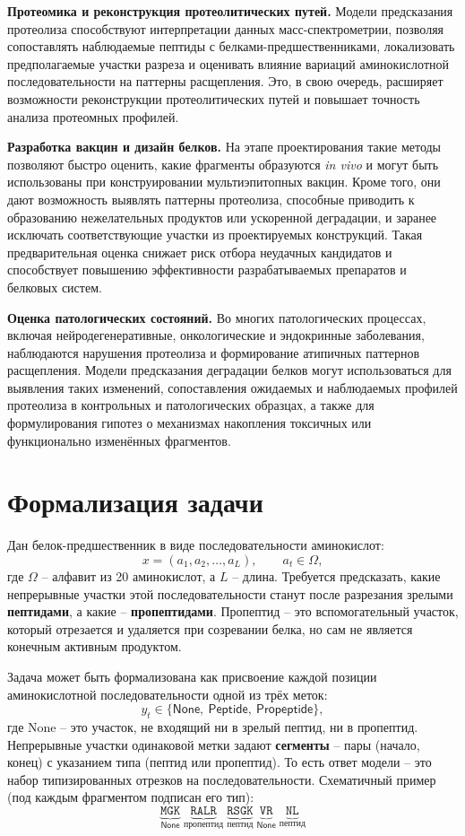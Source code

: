 \documentclass{article}
\begin{document}
\textbf{Протеомика и реконструкция протеолитических путей.} Модели предсказания протеолиза способствуют интерпретации данных масс-спектрометрии, позволяя сопоставлять наблюдаемые пептиды с белками-предшественниками, локализовать предполагаемые участки разреза и оценивать влияние вариаций аминокислотной последовательности на паттерны расщепления. Это, в свою очередь, расширяет возможности реконструкции протеолитических путей и повышает точность анализа протеомных профилей.

\textbf{Разработка вакцин и дизайн белков.} На этапе проектирования такие методы позволяют быстро оценить, какие фрагменты образуются \textit{in vivo} и могут быть использованы при конструировании мультиэпитопных вакцин. Кроме того, они дают возможность выявлять паттерны протеолиза, способные приводить к образованию нежелательных продуктов или ускоренной деградации, и заранее исключать соответствующие участки из проектируемых конструкций. Такая предварительная оценка снижает риск отбора неудачных кандидатов и способствует повышению эффективности разрабатываемых препаратов и белковых систем.

\textbf{Оценка патологических состояний.} Во многих патологических процессах, включая нейродегенеративные, онкологические и эндокринные заболевания, наблюдаются нарушения протеолиза и формирование атипичных паттернов расщепления. Модели предсказания деградации белков могут использоваться для выявления таких изменений, сопоставления ожидаемых и наблюдаемых профилей протеолиза в контрольных и патологических образцах, а также для формулирования гипотез о механизмах накопления токсичных или функционально изменённых фрагментов.

\section{Формализация задачи}
Дан белок-предшественник в виде последовательности аминокислот:
$$ x = (a_1, a_2, \dots, a_L), \qquad a_t \in \Omega, $$
где $\Omega$ -- алфавит из 20 аминокислот, а $L$ -- длина. Требуется предсказать, какие непрерывные участки этой последовательности станут после разрезания зрелыми \textbf{пептидами}, а какие -- \textbf{пропептидами}. Пропептид -- это вспомогательный участок, который отрезается и удаляется при созревании белка, но сам не является конечным активным продуктом.

Задача может быть формализована как присвоение каждой позиции аминокислотной последовательности одной из трёх меток:
$$ y_t \in \{\textsf{None},\ \textsf{Peptide},\ \textsf{Propeptide}\}, $$
где \textsf{None} -- это участок, не входящий ни в зрелый пептид, ни в пропептид. Непрерывные участки одинаковой метки задают \textbf{сегменты} -- пары (начало, конец) с указанием типа (пептид или пропептид). То есть ответ модели -- это набор типизированных отрезков на последовательности. Схематичный пример (под каждым фрагментом подписан его тип):
$$
\underbrace{\texttt{MGK}}_{\textsf{None}}\;
\underbrace{\texttt{RALR}}_{\textsf{пропептид}}\;
\underbrace{\texttt{RSGK}}_{\textsf{пептид}}\;
\underbrace{\texttt{VR}}_{\textsf{None}}\;
\underbrace{\texttt{NL}}_{\textsf{пептид}}
$$
\end{document}
